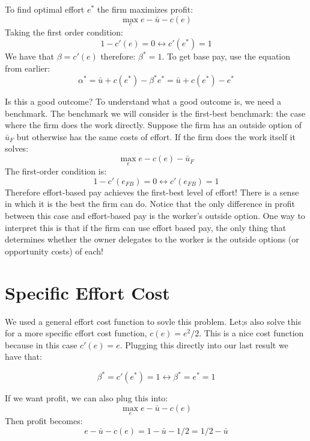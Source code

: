 \documentclass{article}
\begin{document}
To find optimal effort $e^*$ the firm maximizes profit:
\[\max_e e- \bar u-c(e)\]
Taking the first order condition:
\[1-c'(e)=0 \leftrightarrow c'(e^*)=1\]
We have that $\beta=c'(e)$ therefore: $\beta^* = 1$. To get base pay, use the equation from earlier:
\[\alpha^* = \bar u +c(e^*)-\beta^* e^*=\bar u +c(e^*)- e^*\]

Is this a good outcome? To understand what a good outcome is, we need a benchmark. The benchmark we will consider is the first-best benchmark: the case where the firm does the work directly. Suppose the firm has an outside option of $\bar u_F$ but otherwise has the same costs of effort. If the firm does the work itself it solves:
\[\max_e e - c(e)-\bar u_F\]
The first-order condition is:
\[1-c'(e_{FB})=0 \leftrightarrow c'(e_{FB})=1  \]
Therefore effort-based pay achieves the first-best level of effort! There is a sense in which it is the best the firm can do. Notice that the only difference in profit between this case and effort-based pay is the worker's outside option. One way to interpret this is that if the firm can use effort based pay, the only thing that determines whether the owner delegates to the worker is the outside options (or opportunity costs) of each!


\section{Specific Effort Cost}

We used a general effort cost function to sovle this problem. Let;s also solve this for a more specific effort cost function, $c(e)=e^2/2$. This is a nice cost function because in this case $c'(e)=e$. Plugging this directly into our last result we have that:

\[\beta^*=c'(e^*)=1 \leftrightarrow \beta^*=e^*=1\]

If we want profit, we can also plug this into:
\[\max_e e- \bar u-c(e)\]
Then profit becomes:
\[ e- \bar u-c(e) =  1-\bar u -1/2 = 1/2 - \bar u\]
\end{document}
